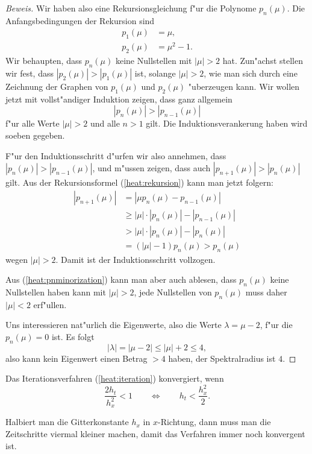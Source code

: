 \begin{proof}[Beweis]
Wir haben also eine Rekursionsgleichung f"ur die Polynome $p_n(\mu)$.
Die Anfangsbedingungen der Rekursion sind
\begin{align*}
p_1(\mu)&=\mu,\\
p_2(\mu)&=\mu^2-1.
\end{align*}
Wir behaupten, dass $p_n(\mu)$ keine Nullstellen mit $|\mu|>2$ hat.
Zun"achst stellen wir fest, dass $|p_2(\mu)| > |p_1(\mu)|$ ist, solange
$|\mu| > 2$, wie man sich durch eine Zeichnung der Graphen von $p_1(\mu)$
und $p_2(\mu)$ "uberzeugen kann.
Wir wollen jetzt mit vollst"andiger Induktion zeigen,
dass ganz allgemein
\begin{equation}
|p_n(\mu)| > |p_{n-1}(\mu)|
\label{heat:pnminorization}
\end{equation}
f"ur alle Werte $|\mu|>2$ und alle $n>1$ gilt. Die Induktionsverankerung
haben wird soeben gegeben.

F"ur den Induktionsschritt d"urfen wir also annehmen,
dass $|p_n(\mu)| > |p_{n-1}(\mu)|$, und m"ussen zeigen,
dass auch $|p_{n+1}(\mu)| > |p_n(\mu)|$ gilt.
Aus der Rekursionsformel (\ref{heat:rekursion})
kann man jetzt folgern:
\begin{align*}
|p_{n+1}(\mu)|
&=|\mu p_{n}(\mu) - p_{n-1}(\mu)|\\
&\ge |\mu|\cdot |p_{n}(\mu)| - |p_{n-1}(\mu)|\\
&>  |\mu|\cdot |p_{n}(\mu)| - |p_{n}(\mu)|\\
&=(|\mu|-1) p_{n}(\mu) > p_{n}(\mu)
\end{align*}
wegen $|\mu|>2$.
Damit ist der Induktionsschritt vollzogen.

Aus (\ref{heat:pnminorization})
kann man aber auch ablesen, dass $p_n(\mu)$ keine Nullstellen
haben kann mit $|\mu| > 2$, jede Nullstellen von $p_n(\mu)$ muss daher
$|\mu|<2$ erf"ullen.

Uns interessieren nat"urlich die Eigenwerte, also die Werte $\lambda=\mu-2$,
f"ur die $p_n(\mu)=0$ ist. Es folgt
\[
|\lambda|=|\mu - 2| \le |\mu|+2 \le 4,
\]
also kann kein Eigenwert einen Betrag $>4$ haben, der Spektralradius ist $4$.
\end{proof}
\begin{satz}
\label{heat:satz-konvergenz}
Das Iterationsverfahren (\ref{heat:iteration}) konvergiert, wenn 
\[
\frac{2h_t}{h_x^2}<1
\qquad
\Leftrightarrow
\qquad
h_t<\frac{h_x^2}2.
\]
\end{satz}
Halbiert man die Gitterkonstante $h_x$ in $x$-Richtung, dann muss man
die Zeitschritte viermal kleiner machen, damit das Verfahren immer
noch konvergent ist.

